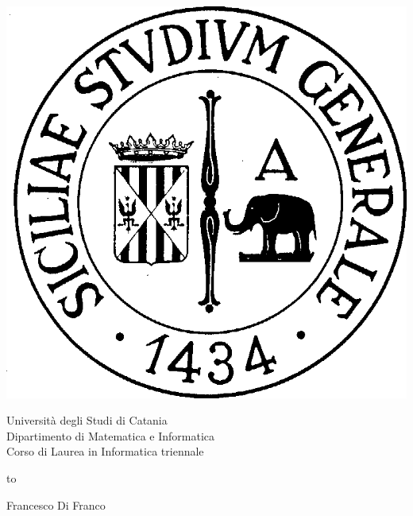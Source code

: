 \begin{titlepage}
\begin{center}


\noindent\begin{minipage}{0.2\textwidth}%
\includegraphics[scale=0.25, bb=0 0 200 200]{./img/logo_unict.png}
\vspace{0.4truecm}
\end{minipage}%
\begin{minipage}{0.8\textwidth}
\begin{center}
\Large{	Università degli Studi di Catania \\
			Dipartimento di Matematica e Informatica \\
			Corso di Laurea in Informatica triennale }

\vspace{0.4truecm}
\end{center}
\end{minipage}
\hbox to \textwidth{\hrulefill}

\vspace{1.5truecm}
\Large {\sc Francesco Di Franco}
\vspace{1.0truecm}


\LARGE{}



\end{center}
\end{titlepage}
